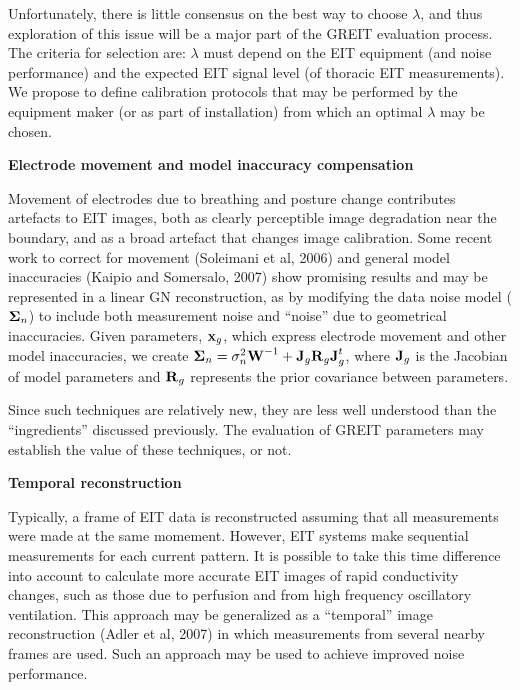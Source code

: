 \documentclass[letterpaper,twocolumn,11pt]{article}
\newcommand{\xB}{\mbox{$\bf x$}}
\newcommand{\JB}{\mbox{$\bf J$}}
\newcommand{\RB}{\mbox{$\bf R$}}
\newcommand{\WB}{\mbox{$\bf W$}}
\newcommand{\SG}{\mbox{$\bf \Sigma$}}
\begin{document}
\begin{list}{\bf {}.}
Unfortunately, there is little consensus on the best
way to choose $\lambda$, and thus exploration of 
this issue will be a major part of the GREIT evaluation
process. The criteria for selection are:
$\lambda$ must depend on the EIT equipment (and noise
performance) and the expected EIT signal level (of
thoracic EIT measurements). We propose to define
calibration protocols that may be performed by the 
equipment maker (or as part of installation) from which
an optimal $\lambda$ may be chosen.

\item {\bf Electrode movement and model inaccuracy compensation}

Movement of electrodes due to breathing and posture change
contributes artefacts to EIT images, both as clearly perceptible
image degradation near the boundary, and as a broad artefact
that changes image calibration. 
Some recent work to correct for movement (Soleimani et al, 2006)
and general model inaccuracies (Kaipio and Somersalo, 2007)
show promising results and may be represented in a linear
GN reconstruction, as by modifying the data noise model
($\SG_n$) to include both measurement noise and ``noise'' 
due to geometrical inaccuracies. Given parameters, $\xB_g$,
which express electrode movement and other model inaccuracies,
we create $\SG_n = \sigma_n^2 \WB^{-1} + \JB_g \RB_g \JB_g^t$,
where $\JB_g$ is the Jacobian of model parameters and $\RB_g$
represents the prior covariance between parameters.

Since such techniques are relatively new, they are less well
understood than the ``ingredients'' discussed previously. 
The evaluation of GREIT parameters may establish the value
of these techniques, or not.

\item {\bf Temporal reconstruction}

Typically, a frame of EIT data is reconstructed assuming
that all measurements were made at the same momement.
However, EIT systems make sequential measurements for
each current pattern. It is possible to take this
time difference into account to calculate more
accurate EIT images of rapid conductivity changes, such
as those due to perfusion and from high frequency oscillatory
ventilation. This approach may be generalized as 
a ``temporal'' image reconstruction (Adler et al, 2007)
in which measurements from several nearby frames are
used. Such an approach may be used to
achieve improved noise performance.

\end{list}
\end{document}
